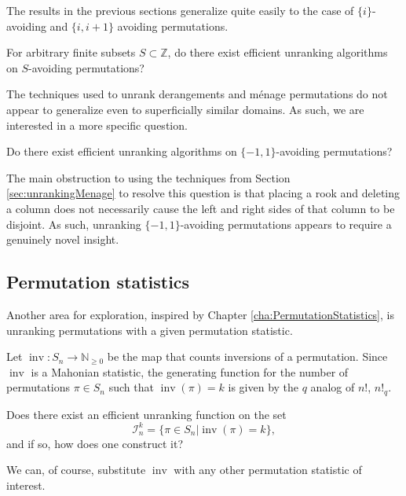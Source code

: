 The results in the previous sections generalize quite easily to the case of
$\{i\}$-avoiding and $\{i, i+1\}$ avoiding permutations.

\begin{openquestion}
  For arbitrary finite subsets $S \subset \mathbb Z$,
  do there exist efficient unranking algorithms on $S$-avoiding permutations?
\end{openquestion}

The techniques used to unrank derangements and m\'enage permutations do
not appear to generalize even to superficially similar domains.
As such, we are interested in a more specific question.
\begin{openquestion}
  Do there exist efficient unranking algorithms on $\{-1, 1\}$-avoiding
  permutations?
\end{openquestion}

The main obstruction to using the techniques from
Section \ref{sec:unrankingMenage} to resolve this question is that placing
a rook and deleting a column does not necessarily cause the left and right
sides of that column to be disjoint. As such, unranking $\{-1,1\}$-avoiding
permutations appears to require a genuinely novel insight.

\subsection{Permutation statistics}
Another area for exploration, inspired by Chapter \ref{cha:PermutationStatistics},
is unranking permutations with a given permutation statistic.

\begin{openquestion}
  Let $\operatorname{inv}\colon S_n \rightarrow \mathbb N_{\geq 0}$ be the map
  that counts inversions of a permutation. Since $\operatorname{inv}$ is a
  Mahonian statistic, the generating function for the number of permutations
  $\pi \in S_n$ such that $\operatorname{inv}(\pi) = k$ is given by the
  $q$ analog of $n!$, $n!_q$.

  Does there exist an efficient unranking function on the set \begin{equation}
    \mathcal{I}_n^k = \{\pi \in S_n | \operatorname{inv}(\pi) = k\},
  \end{equation} and if so, how does one construct it?
\end{openquestion}

We can, of course, substitute $\operatorname{inv}$ with any other permutation
statistic of interest.


